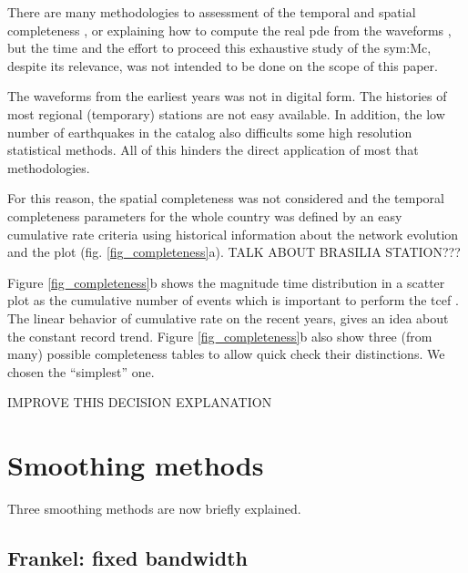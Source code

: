 \documentclass[grl]{agutex}
\begin{document}
\begin{article}
There are many methodologies to assessment of the temporal and spatial completeness \citep{stepp_1972, mignan_woessner_2012, ogata_1993, wiemer_wyss_2000, cao_gao_2002, stucchi_2004, woessner_2005, mignan_2011, mignan_2012, vorobieva_2013, mignan_2013, nasir_2013, mignan_2014}, or explaining how to compute the real \gls{pde} from the waveforms \citep{schorlemmer_2008}, but the time and the effort to proceed this exhaustive study of the \glsdesc{sym:Mc}, despite its relevance, was not intended to be done on the scope of this paper.

The waveforms from the earliest years was not in digital form. The histories of most regional (temporary) stations are not easy available. In addition, the low number of earthquakes in the catalog also difficults some high resolution statistical methods. All of this hinders the direct application of most that methodologies.

For this reason, the spatial completeness was not considered and the temporal completeness parameters for the whole country was defined by an easy cumulative rate criteria using historical information about the network evolution and the \citet{stepp_1972} plot (fig. \ref{fig_completeness}a). TALK ABOUT BRASILIA STATION??? 

Figure \ref{fig_completeness}b shows the magnitude time distribution in a scatter plot as the cumulative number of events which is important to perform the \gls{tcef} \citep{nasir_2013}. The linear behavior of cumulative rate on the recent years, gives an idea about the constant record trend. Figure \ref{fig_completeness}b also show three (from many) possible completeness tables to allow quick check their distinctions. We chosen the ``simplest'' one. 

IMPROVE THIS DECISION EXPLANATION

%
%
\section{Smoothing methods}
Three smoothing methods are now briefly explained.

\subsection{Frankel: fixed bandwidth}


\end{article}
\end{document}
